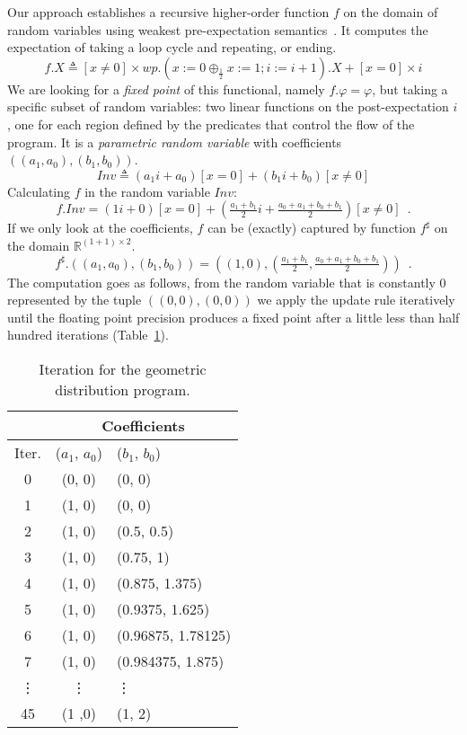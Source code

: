 \documentclass{eptcs}
\theoremstyle{plain}
\theoremstyle{definition}
\newcommand{\Real}{\ensuremath{\mathbb R}}
\newcommand{\lit}[1]{\ensuremath{\mathit{#1}}}
\newcommand{\Def}{\ensuremath{\triangleq}}
\newcommand{\Wp}{\lit{wp}}
\begin{document}
Our approach establishes a recursive higher-order function $f$ on the domain of random variables using weakest pre-expectation semantics~\cite{morgan04arp}.
It computes the expectation of taking a loop cycle and repeating, or ending.
\[ f.X \Def [x\neq 0]\times \Wp.(x:=0 \oplus_{\frac{1}{2}} x:=1; i:=i+1).X + [x=0]\times i \]
We are looking for a \emph{fixed point} of this functional, namely $f.\varphi=\varphi$, but taking a specific subset of random variables: two linear functions on the post-expectation $i$, one for each region defined by the predicates that control the flow of the program.
It is a \emph{parametric random variable} with coefficients $((a_1,a_0),(b_1,b_0))$.
\[ \textit{Inv} \Def (a_1 i + a_0) [x=0] + (b_1 i + b_0) [x\neq0] \]
Calculating $f$ in the random variable $\textit{Inv}$:
\[ f.\textit{Inv} = (1 i + 0) [x=0] + (\tfrac{a_1+b_1}{2}i + \tfrac{a_0+a_1+b_0+b_1}{2}) [x\neq0]\enspace. \]
If we only look at the coefficients, $f$ can be (exactly) captured by function $f^\sharp$ on the domain $\Real^{(1+1)\times 2}$.
\[ f^\sharp.((a_1,a_0),(b_1,b_0)) = ((1,0),(\tfrac{a_1+b_1}{2},\tfrac{a_0+a_1+b_0+b_1}{2})) \enspace.\]
The computation goes as follows, from the random variable that is constantly $0$ represented by the tuple $((0,0),(0,0))$ we apply the update rule iteratively until the floating point precision produces a fixed point after a little less than half hundred iterations (Table~\ref{table:geometric}).
\begin{table}[!ht]
\begin{small}
\begin{center}
\begin{tabular}{|c||c|l|}
\hline
& \multicolumn{2}{|c|}{Coefficients} \\
\hline
Iter. & ($a_1$, $a_0$) & ($b_1$, $b_0$)  \\
\hline
0  &  (0, 0) & (0, 0) \\
1  &  (1, 0) & (0, 0) \\
2  &  (1, 0) & (0.5, 0.5) \\
3  &  (1, 0) & (0.75, 1) \\
4  &  (1, 0) & (0.875, 1.375) \\
5  &  (1, 0) & (0.9375, 1.625) \\
6  &  (1, 0) & (0.96875, 1.78125) \\
7  &  (1, 0) & (0.984375, 1.875) \\
\vdots & \vdots & \phantom{(1,}\vdots  \\
45  &  (1 ,0) & (1, 2)\\
\hline
\end{tabular}
\end{center}
\end{small}
\caption{Iteration for the geometric distribution program.}
\label{table:geometric}
\end{table}
\end{document}

